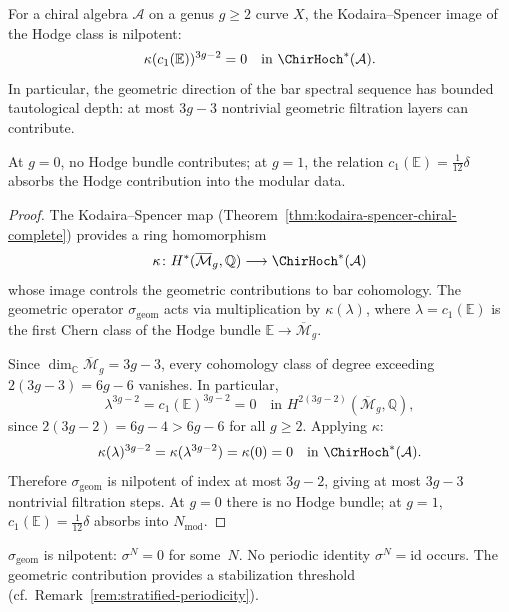 \begin{theorem}
\label{thm:geometric-periodicity-weak}
For a chiral algebra $\mathcal{A}$ on a genus $g \geq 2$ curve $X$,
the Kodaira--Spencer image of the Hodge class is nilpotent:
\[
\kappa(c_1(\mathbb{E}))^{3g-2} = 0
\quad \text{in } \ChirHoch^*(\mathcal{A}).
\]
In particular, the geometric direction of the bar spectral sequence
has bounded tautological depth: at most $3g - 3$ nontrivial geometric
filtration layers can contribute.

At $g = 0$, no Hodge bundle contributes; at $g = 1$, the relation
$c_1(\mathbb{E}) = \frac{1}{12}\delta$ absorbs the Hodge
contribution into the modular data.
\end{theorem}

\begin{proof}
The Kodaira--Spencer map (Theorem~\ref{thm:kodaira-spencer-chiral-complete}) provides a ring homomorphism
\[
\kappa \colon H^*(\overline{\mathcal{M}}_g, \mathbb{Q}) \longrightarrow \ChirHoch^*(\mathcal{A})
\]
whose image controls the geometric contributions to bar cohomology.
The geometric operator $\sigma_{\mathrm{geom}}$ acts via
multiplication by $\kappa(\lambda)$, where
$\lambda = c_1(\mathbb{E})$ is the first Chern class of the Hodge
bundle $\mathbb{E} \to \overline{\mathcal{M}}_g$.

Since $\dim_{\mathbb{C}} \overline{\mathcal{M}}_g = 3g - 3$, every cohomology class of degree exceeding $2(3g-3) = 6g - 6$ vanishes. In particular,
\[
\lambda^{3g-2} = c_1(\mathbb{E})^{3g-2} = 0 \quad \text{in } H^{2(3g-2)}(\overline{\mathcal{M}}_g, \mathbb{Q}),
\]
since $2(3g-2) = 6g - 4 > 6g - 6$ for all $g \geq 2$. Applying $\kappa$:
\[
\kappa(\lambda)^{3g-2} = \kappa(\lambda^{3g-2}) = \kappa(0) = 0 \quad \text{in } \ChirHoch^*(\mathcal{A}).
\]
Therefore $\sigma_{\mathrm{geom}}$ is nilpotent of index at most $3g - 2$, giving at most $3g - 3$ nontrivial filtration steps. At $g = 0$ there is no Hodge bundle; at $g = 1$, $c_1(\mathbb{E}) = \frac{1}{12}\delta$ absorbs into $N_{\mathrm{mod}}$.
\end{proof}

\begin{remark}
\label{rem:nilpotent-vs-periodic}
$\sigma_{\mathrm{geom}}$ is nilpotent: $\sigma^N = 0$ for some~$N$.
No periodic identity $\sigma^N=\mathrm{id}$ occurs. The geometric
contribution provides a stabilization threshold
(cf.\ Remark~\ref{rem:stratified-periodicity}).
\end{remark}

